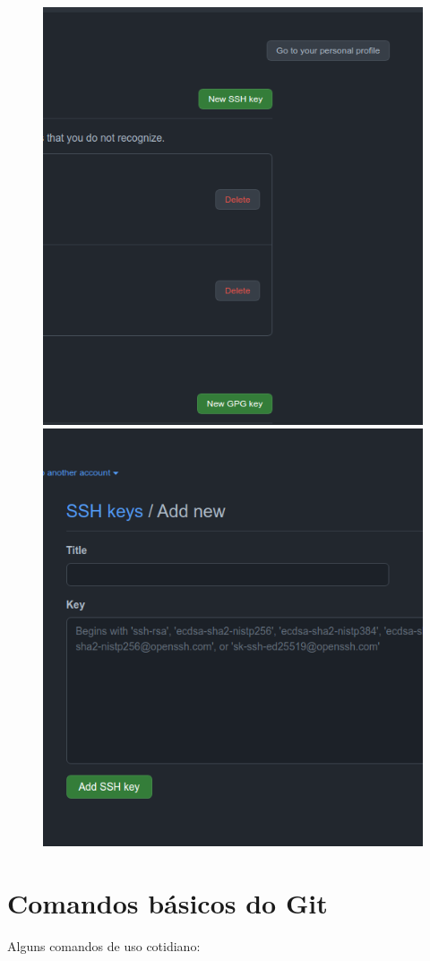 \documentclass[12pt]{article}
\begin{document}
\begin{figure}[htb]
	\centering
	\includegraphics[width=0.4\linewidth]{figures/ssh_3}
	\includegraphics[width=0.4\linewidth]{figures/ssh_4}
\end{figure}

\section{Comandos básicos do Git}\label{sec:comandos_pc}

Alguns comandos de uso cotidiano:
\end{document}
